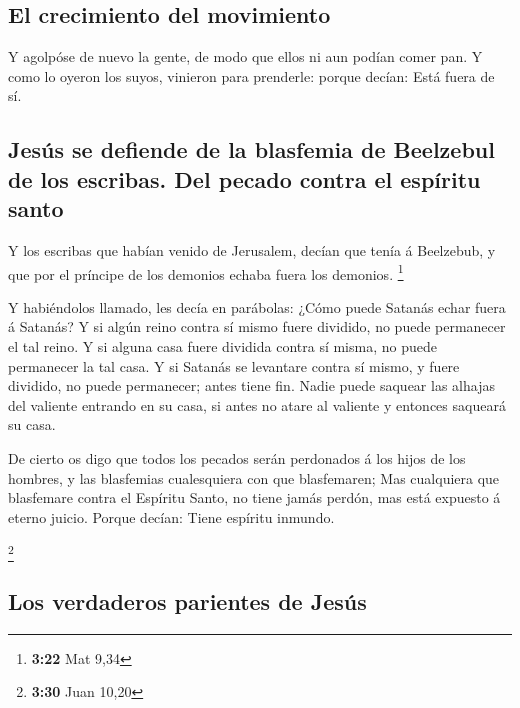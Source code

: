\hypertarget{el-crecimiento-del-movimiento}{%
\subsection{El crecimiento del
movimiento}\label{el-crecimiento-del-movimiento}}

 Y agolpóse de nuevo la gente, de modo que ellos ni aun
podían comer pan.  Y como lo oyeron los suyos, vinieron
para prenderle: porque decían: Está fuera de sí.

\hypertarget{jesuxfas-se-defiende-de-la-blasfemia-de-beelzebul-de-los-escribas.-del-pecado-contra-el-espuxedritu-santo}{%
\subsection{Jesús se defiende de la blasfemia de Beelzebul de los
escribas. Del pecado contra el espíritu
santo}\label{jesuxfas-se-defiende-de-la-blasfemia-de-beelzebul-de-los-escribas.-del-pecado-contra-el-espuxedritu-santo}}

 Y los escribas que habían venido de Jerusalem, decían que
tenía á Beelzebub, y que por el príncipe de los demonios echaba fuera
los demonios. \footnote{\textbf{3:22} Mat 9,34}

 Y habiéndolos llamado, les decía en parábolas: ¿Cómo puede
Satanás echar fuera á Satanás?  Y si algún reino contra sí
mismo fuere dividido, no puede permanecer el tal reino.  Y
si alguna casa fuere dividida contra sí misma, no puede permanecer la
tal casa.  Y si Satanás se levantare contra sí mismo, y
fuere dividido, no puede permanecer; antes tiene fin. 
Nadie puede saquear las alhajas del valiente entrando en su casa, si
antes no atare al valiente y entonces saqueará su casa.

 De cierto os digo que todos los pecados serán perdonados á
los hijos de los hombres, y las blasfemias cualesquiera con que
blasfemaren;  Mas cualquiera que blasfemare contra el
Espíritu Santo, no tiene jamás perdón, mas está expuesto á eterno
juicio.  Porque decían: Tiene espíritu inmundo.

\footnote{\textbf{3:30} Juan 10,20}

\hypertarget{los-verdaderos-parientes-de-jesuxfas}{%
\subsection{Los verdaderos parientes de
Jesús}\label{los-verdaderos-parientes-de-jesuxfas}}

